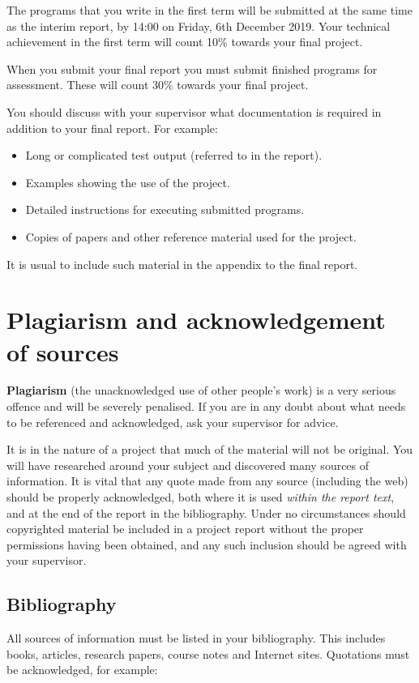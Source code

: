 \documentclass[11pt]{article}
\newcommand{\reviewSubmissiondate}{14:00 on Friday, 6th December 2019} %
\newcommand{\programweight}{30\% }
\newcommand{\interimtechnicalweight}{10\% }
\begin{document}
The programs that you write in the first term will be submitted at the same time as the interim report, by \reviewSubmissiondate.
Your technical achievement in the first term will count \interimtechnicalweight towards your final project.

When you submit your final report you must submit finished programs for assessment.  These will count \programweight towards your final project.

You should discuss with your supervisor what documentation is required in addition to your final report. For example:
\begin{itemize}
\item Long or complicated test output (referred to in the report).
\item Examples showing the use of the project.
\item Detailed instructions for executing submitted programs.
\item Copies of papers and other reference material used for the project.
\end{itemize}

It is usual to include such material in the appendix to the final report.

\newpage
\section{Plagiarism and acknowledgement of sources}
\label{sec:plagiarism}
\textbf{Plagiarism} (the unacknowledged use of other people's work) is a very serious offence and will be severely penalised.
If you are in any doubt about what needs to be referenced and acknowledged, ask your supervisor for advice.

It is in the nature of a project that much of the material will not be original.  You will have researched around your subject and discovered many sources of information.  It is vital that any quote made from any source (including the web) should be properly acknowledged, both where it is used {\it within the report text}, and  at the end of the report in the bibliography.  Under no circumstances should copyrighted material be included in a project report without the proper permissions having been obtained, and any such inclusion should be agreed with your supervisor.

\subsection{Bibliography}
All sources of information must be listed in your bibliography. This includes books, articles, research papers, course notes and Internet sites. Quotations must be acknowledged, for example:
\end{document}
